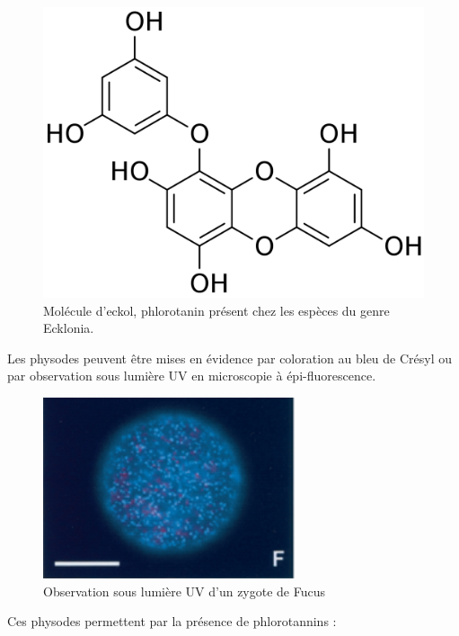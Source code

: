 \documentclass[
]{book}
\begin{document}
\begin{figure}[H]

{\centering \includegraphics[width=17.78in]{images/Eckol} 

}

\caption{Molécule d'eckol, phlorotanin présent chez les espèces du genre Ecklonia.}\label{fig:eckol}
\end{figure}

Les physodes peuvent être mises en évidence par coloration au bleu de Crésyl ou par observation sous lumière UV en microscopie à épi-fluorescence.

\begin{figure}[H]

{\centering \includegraphics[width=2.94in]{images/physode1} 

}

\caption{Observation sous lumière UV d’un zygote de Fucus}\label{fig:physode}
\end{figure}

Ces physodes permettent par la présence de phlorotannins :
\end{document}
